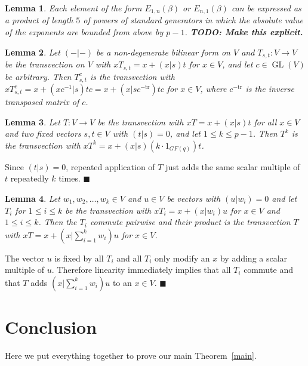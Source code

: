\documentclass[a4paper,11pt]{article}
\def\GL{\operatorname{GL}}
\newcommand{\fixme}[1]{\textbf{#1}}
\newcommand{\tr}{\mathrm{tr}}
\newcommand{\proofend}{\hfill$\blacksquare$}
\newtheorem{lemma}{Lemma}
\begin{document}
\begin{lemma}
\label{transvecs}
Each element of the form $E_{1,n}(\beta)$ or $E_{n,1}(\beta)$ can be
expressed as a product of length $5$ of powers of standard generators
in which the absolute value of the exponents are bounded from above 
by $p-1$. \fixme{TODO: Make this explicit.}
\end{lemma}

\begin{lemma}
\label{conjtransv}
Let $(-|-)$ be a non-degenerate bilinear form on $V$ and $T_{s,t}:V
\to V$ be the transvection on $V$ with $xT_{s,t} = x+(x|s)t$ for $x
\in V$, and let $c \in \GL(V)$ be arbitrary. 
Then $T_{s,t}^c$ is the transvection with 
$xT_{s,t}^c = x + (xc^{-1}|s)tc = x + (x|sc^{-\tr})tc$ for $x \in V$, 
where $c^{-\tr}$ is the inverse transposed matrix of $c$.
\end{lemma}

\begin{lemma}
\label{powertrans}
Let $T : V \to V$ be the transvection with $xT = x+(x|s)t$ for all
$x \in V$ and two fixed vectors $s,t \in V$ with $(t|s)=0$, and let 
$1 \le k \le p-1$. Then $T^k$ is the transvection
with $xT^k = x + (x|s)(k\cdot 1_{GF(q)}) t$.
\end{lemma}
\proof Since $(t|s)=0$, repeated application of $T$ just adds the same
scalar multiple of $t$ repeatedly $k$ times.
\proofend

\begin{lemma}
\label{lincombtrans}
Let $w_1, w_2, \ldots, w_k \in V$ and $u \in V$ be vectors with 
$(u|w_i)=0$ and let $T_i$ for $1 \le
i \le k$ be the transvection with $xT_i = x + (x|w_i)u$ for $x \in V$
and $1 \le i \le k$. 
Then the $T_i$ commute pairwise and their product is the transvection $T$
with $xT = x + (x|\sum_{i=1}^k w_i) u$ for $x \in V$.
\end{lemma}
\proof The vector $u$ is fixed by all $T_i$ and all $T_i$ only modify
an $x$ by adding a scalar multiple of $u$. Therefore linearity
immediately implies that all $T_i$ commute and that $T$ adds
$(x|\sum_{i=1}^k w_i)u$ to an $x \in V$.
\proofend

\section{Conclusion}

Here we put everything together to prove our main Theorem~\ref{main}.
\end{document}
